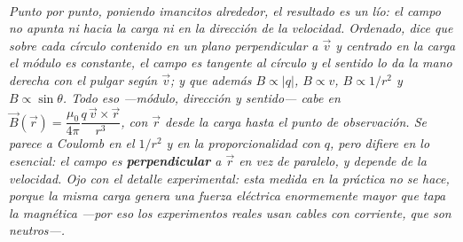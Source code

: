 \begin{center}
\\[0.5em]
{\small\itshape Punto por punto, poniendo imancitos alrededor, el resultado es
un lío: el campo no apunta ni hacia la carga ni en la dirección de la velocidad.
Ordenado, dice que sobre cada círculo contenido en un plano perpendicular a
$\vec v$ y centrado en la carga el módulo es constante, el campo es tangente al
círculo y el sentido lo da la mano derecha con el pulgar según $\vec v$; y que
además $B\propto|q|$, $B\propto v$, $B\propto 1/r^2$ y $B\propto\sin\theta$.
Todo eso ---módulo, dirección y sentido--- cabe en
$\vec B(\vec r)=\dfrac{\mu_0}{4\pi}\dfrac{q\,\vec v\times\vec r}{r^3}$,
con $\vec r$ desde la carga hasta el punto de observación. Se parece a Coulomb
en el $1/r^2$ y en la proporcionalidad con $q$, pero difiere en lo esencial: el
campo es \textbf{perpendicular} a $\vec r$ en vez de paralelo, y depende de la
velocidad. Ojo con el detalle experimental: esta medida en la práctica no se
hace, porque la misma carga genera una fuerza eléctrica enormemente mayor que
tapa la magnética ---por eso los experimentos reales usan cables con corriente,
que son neutros---.}
\end{center}
